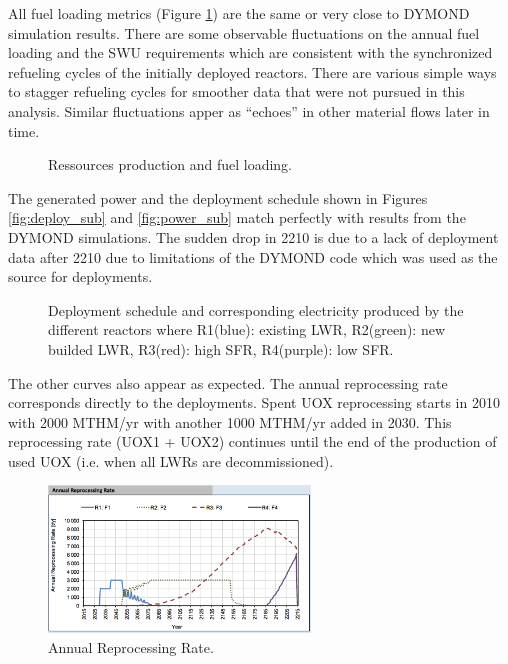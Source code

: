\documentclass[12pt]{article}
\begin{document}
All fuel loading metrics (Figure \ref{fig:RessourceUsed}) are the same or very
close to DYMOND simulation results. There are some observable fluctuations on
the annual fuel loading and the SWU requirements which are consistent with the
synchronized refueling cycles of the initially deployed reactors.  There are
various simple ways to stagger refueling cycles for smoother data that were
not pursued in this analysis.  Similar fluctuations apper as ``echoes'' in 
other material flows later in time.

\begin{figure}[h!]
    \centering
    \caption{Ressources production and fuel loading.\label{fig:RessourceUsed} }
\end{figure}

The generated power and the deployment schedule shown in Figures
\ref{fig:deploy_sub} and \ref{fig:power_sub} match perfectly with results from
the DYMOND simulations. The sudden drop in 2210 is due to a lack of deployment
data after 2210 due to limitations of the DYMOND code which was used as the
source for deployments.


\begin{figure}[h!]
    \centering
    \caption{Deployment schedule and corresponding
    electricity produced by the different reactors
    where R1(blue): existing LWR, R2(green): new
    builded LWR, R3(red): high SFR, R4(purple): low
    SFR.\label{fig:deployment_bis} }
\end{figure}

The other curves also appear as expected. The annual reprocessing rate
corresponds directly to the deployments. Spent UOX reprocessing starts in 2010
with 2000 MTHM/yr with another 1000 MTHM/yr added in 2030.  This reprocessing
rate (UOX1 + UOX2) continues until the end of the production of used UOX (i.e.
when all LWRs are decommissioned).

\begin{figure}[h!]
    \centering
    \includegraphics[width=0.62\textwidth]	{img/AnnualReprocessingRate_1}
    \caption{Annual Reprocessing Rate.}
    \label{fig:reprocessing_1}
\end{figure}
\end{document}
